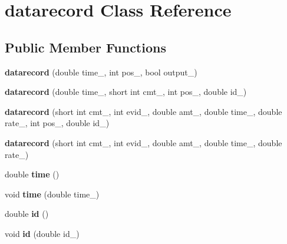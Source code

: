 \hypertarget{classdatarecord}{}\section{datarecord Class Reference}
\label{classdatarecord}
\subsection*{Public Member Functions}
\begin{DoxyCompactItemize}
\item 
\mbox{\label{classdatarecord_a57566eae869dfb8e813c10670852ec07}} 
{\bfseries datarecord} (double time\+\_\+, int pos\+\_\+, bool output\+\_\+)
\item 
\mbox{\label{classdatarecord_a73f77d80f8b614d6ce41ef4958e94bc4}} 
{\bfseries datarecord} (double time\+\_\+, short int cmt\+\_\+, int pos\+\_\+, double id\+\_\+)
\item 
\mbox{\label{classdatarecord_ad07f800501f2c89627c1a3ddcb107077}} 
{\bfseries datarecord} (short int cmt\+\_\+, int evid\+\_\+, double amt\+\_\+, double time\+\_\+, double rate\+\_\+, int pos\+\_\+, double id\+\_\+)
\item 
\mbox{\label{classdatarecord_a9bef6b545a4272423d4184271a9446a3}} 
{\bfseries datarecord} (short int cmt\+\_\+, int evid\+\_\+, double amt\+\_\+, double time\+\_\+, double rate\+\_\+)
\item 
\mbox{\label{classdatarecord_a5dd75fd104ef14656b379d4abfc9065f}} 
double {\bfseries time} ()
\item 
\mbox{\label{classdatarecord_a5960945f7cdd5688c8ca996f98d4ff15}} 
void {\bfseries time} (double time\+\_\+)
\item 
\mbox{\label{classdatarecord_a9eb6d34c60695470a362de77c74e67bb}} 
double {\bfseries id} ()
\item 
\mbox{\label{classdatarecord_a103289c305ed04d3ba4e4d609a2b90aa}} 
void {\bfseries id} (double id\+\_\+)
\item 
\mbox{\label{classdatarecord_a931a64a5c3e9ad6f63c64b4fbf76afb6}} 

\end{DoxyCompactItemize}
